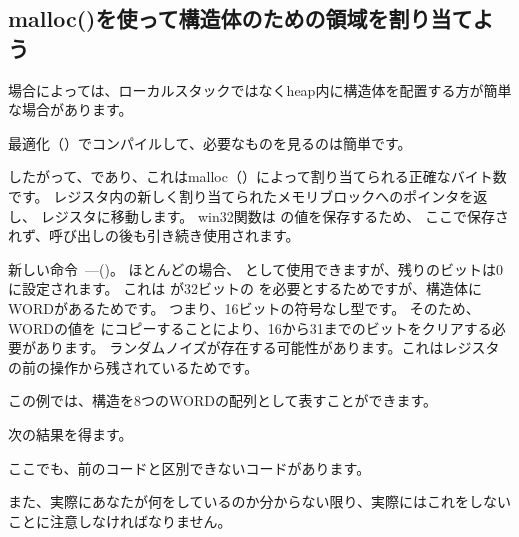 ﻿\subsection{malloc()を使って構造体のための領域を割り当てよう}
\label{struct_malloc_example}


場合によっては、ローカルスタックではなく\gls{heap}内に構造体を配置する方が簡単な場合があります。




最適化（\Ox）でコンパイルして、必要なものを見るのは簡単です。




したがって、であり、これはmalloc（）によって割り当てられる正確なバイト数です。 
\EAX レジスタ内の新しく割り当てられたメモリブロックへのポインタを返し、
\ESI レジスタに移動します。
 win32関数は \ESI の値を保存するため、
ここで保存されず、呼び出しの後も引き続き使用されます。


新しい命令~---\MOVZX ()。 
ほとんどの場合、 \MOVSX として使用できますが、残りのビットは0に設定されます。
これは \printf が32ビットの \Tint を必要とするためですが、構造体にWORDがあるためです。
つまり、16ビットの符号なし型です。 
そのため、WORDの値を \Tint{} にコピーすることにより、16から31までのビットをクリアする必要があります。
ランダムノイズが存在する可能性があります。これはレジスタの前の操作から残されているためです。

この例では、構造を8つのWORDの配列として表すことができます。



次の結果を得ます。




ここでも、前のコードと区別できないコードがあります。

また、実際にあなたが何をしているのか分からない限り、実際にはこれをしないことに注意しなければなりません。
